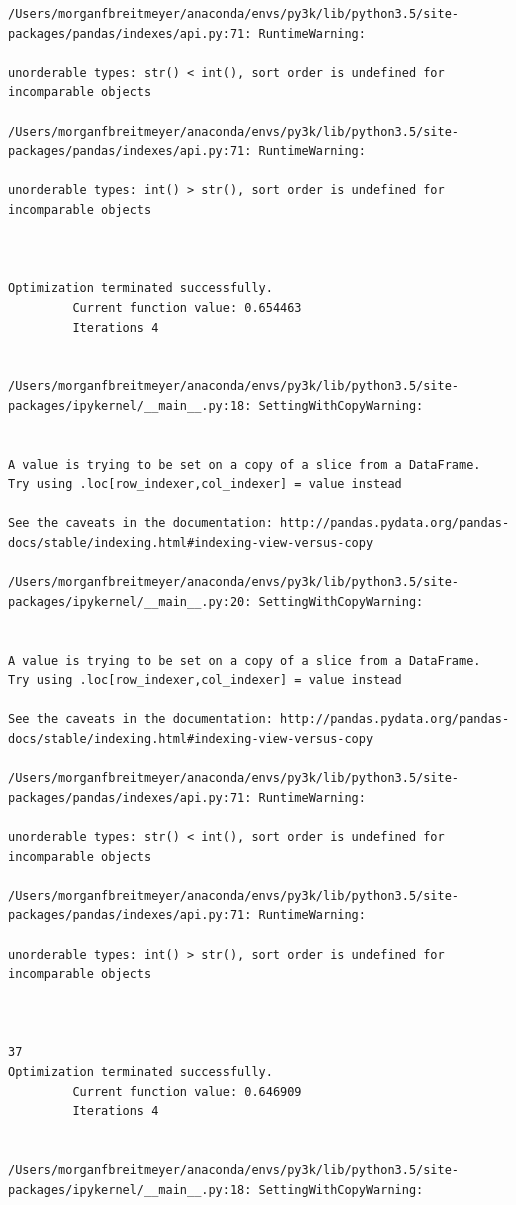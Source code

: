 \begin{lstlisting}
/Users/morganfbreitmeyer/anaconda/envs/py3k/lib/python3.5/site-packages/pandas/indexes/api.py:71: RuntimeWarning:

unorderable types: str() < int(), sort order is undefined for incomparable objects

/Users/morganfbreitmeyer/anaconda/envs/py3k/lib/python3.5/site-packages/pandas/indexes/api.py:71: RuntimeWarning:

unorderable types: int() > str(), sort order is undefined for incomparable objects



Optimization terminated successfully.
         Current function value: 0.654463
         Iterations 4


/Users/morganfbreitmeyer/anaconda/envs/py3k/lib/python3.5/site-packages/ipykernel/__main__.py:18: SettingWithCopyWarning:


A value is trying to be set on a copy of a slice from a DataFrame.
Try using .loc[row_indexer,col_indexer] = value instead

See the caveats in the documentation: http://pandas.pydata.org/pandas-docs/stable/indexing.html#indexing-view-versus-copy

/Users/morganfbreitmeyer/anaconda/envs/py3k/lib/python3.5/site-packages/ipykernel/__main__.py:20: SettingWithCopyWarning:


A value is trying to be set on a copy of a slice from a DataFrame.
Try using .loc[row_indexer,col_indexer] = value instead

See the caveats in the documentation: http://pandas.pydata.org/pandas-docs/stable/indexing.html#indexing-view-versus-copy

/Users/morganfbreitmeyer/anaconda/envs/py3k/lib/python3.5/site-packages/pandas/indexes/api.py:71: RuntimeWarning:

unorderable types: str() < int(), sort order is undefined for incomparable objects

/Users/morganfbreitmeyer/anaconda/envs/py3k/lib/python3.5/site-packages/pandas/indexes/api.py:71: RuntimeWarning:

unorderable types: int() > str(), sort order is undefined for incomparable objects



37
Optimization terminated successfully.
         Current function value: 0.646909
         Iterations 4


/Users/morganfbreitmeyer/anaconda/envs/py3k/lib/python3.5/site-packages/ipykernel/__main__.py:18: SettingWithCopyWarning:



\end{lstlisting}
